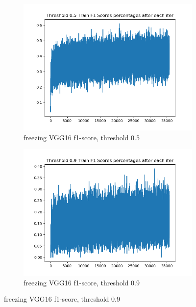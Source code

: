 \documentclass[12pt]{article}
\begin{document}
\begin{figure}[!ht]
\centering
\begin{subfigure}{.5\textwidth}
	\centering
	\includegraphics[width=1\linewidth]{vgg16-0_26-lazy-1-train-scores-f1-5.png}
	\caption{\label{vgg16:vgg16-0_26-lazy-1-train-scores-f1-5}freezing VGG16 f1-score, threshold 0.5}
\end{subfigure}%
\begin{subfigure}{.5\textwidth}
	\centering
	\includegraphics[width=1\linewidth]{vgg16-0_26-lazy-1-train-scores-f1-9.png}
	\caption{\label{vgg16:vgg16-0_26-lazy-1-train-scores-f1-9}freezing VGG16 f1-score, threshold 0.9}
\end{subfigure}
\end{figure}
\end{document}
